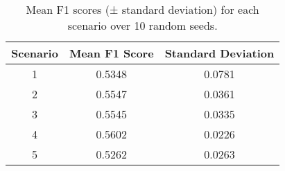 \begin{table}[ht]
    \centering
    \begin{tabular}{@{} c c c @{}}
        \toprule
        Scenario & Mean F1 Score & Standard Deviation \\ 
        \midrule
        1 & 0.5348 & 0.0781 \\ 
        2 & 0.5547 & 0.0361 \\ 
        3 & 0.5545 & 0.0335 \\ 
        4 & 0.5602 & 0.0226 \\ 
        5 & 0.5262 & 0.0263 \\ 
        \bottomrule
    \end{tabular}
    \caption{Mean F1 scores (± standard deviation) for each scenario over 10 random seeds.}
    \label{tab:f1_scenarios}
\end{table}

